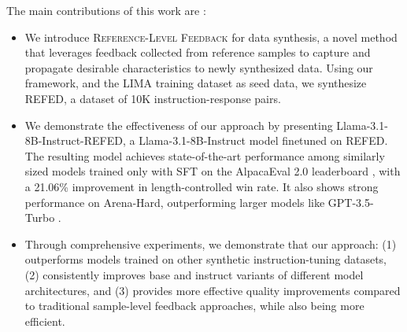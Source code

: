 The main contributions of this work are \footnotemark[1]:
\begin{itemize}
    \item We introduce \textsc{Reference-Level Feedback} for data synthesis, a novel method that leverages feedback collected from reference samples to capture and propagate desirable characteristics to newly synthesized data. Using our framework, and the LIMA \citep{lima} training dataset as seed data, we synthesize \textsc{REFED}, a dataset of 10K instruction-response pairs.
    \item We demonstrate the effectiveness of our approach by presenting Llama-3.1-8B-Instruct-\textsc{REFED}, a Llama-3.1-8B-Instruct model finetuned on \textsc{REFED}. The resulting model achieves state-of-the-art performance among similarly sized models trained only with SFT on the AlpacaEval 2.0 leaderboard \citep{dubois2024lengthcontrolledalpacaevalsimpleway}, with a 21.06\% improvement in length-controlled win rate. It also shows strong performance on Arena-Hard, outperforming larger models like GPT-3.5-Turbo \citep{arenahard2024}.
    \item Through comprehensive experiments, we demonstrate that our approach: (1) outperforms models trained on other synthetic instruction-tuning datasets, (2) consistently improves base and instruct variants of different model architectures, and (3) provides more effective quality improvements compared to traditional sample-level feedback approaches, while also being more efficient.
\end{itemize}

